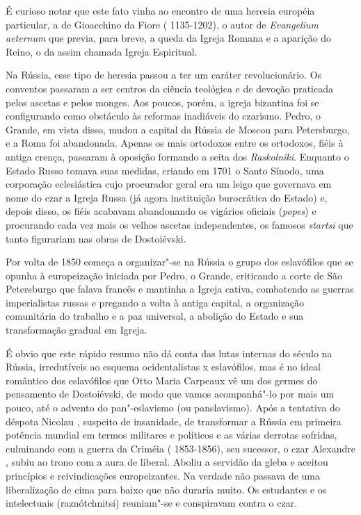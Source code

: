 É curioso notar que este fato vinha ao encontro de uma heresia européia
particular, a de Gioacchino da Fiore ( 1135-1202), o autor de
\emph{Evangelium aeternum} que previa, para breve, a queda da Igreja
Romana e a aparição do  Reino, o da assim chamada Igreja Espiritual.

Na Rússia, esse tipo de heresia passou a ter um caráter revolucionário.
Os conventos passaram a ser centros da ciência teológica e de devoção
praticada pelos ascetas e pelos monges. Aos poucos, porém, a igreja
bizantina foi se configurando como obstáculo às reformas inadiáveis do
czarismo. Pedro, o Grande, em vista disso, mudou a capital da Rússia de
Moscou para Petersburgo, e a  Roma foi abandonada. Apenas os mais
ortodoxos entre os ortodoxos, fiéis à antiga crença, passaram à oposição
formando a seita dos \emph{Raskolniki}. Enquanto o Estado Russo tomava
suas medidas, criando em 1701 o Santo Sínodo, uma corporação
eclesiástica cujo procurador geral era um leigo que governava em nome do
czar a Igreja Russa (já agora instituição burocrática do Estado) e,
depois disso, os fiéis acabavam abandonando os vigários oficiais
(\emph{popes}) e procurando cada vez mais os velhos ascetas
independentes, os famosos \emph{startsi} que tanto figurariam nas obras
de Dostoiévski.

Por volta de 1850 começa a organizar"-se na Rússia o grupo dos
eslavófilos que se opunha à europeização iniciada por Pedro, o Grande,
criticando a corte de São Petersburgo que falava francês e mantinha a
Igreja cativa, combatendo as guerras imperialistas russas e pregando a
volta à antiga capital, a organização comunitária do trabalho e a paz
universal, a abolição do Estado e sua transformação gradual em Igreja.

É obvio que este rápido resumo não dá conta das lutas internas do século
 na Rússia, irredutíveis ao esquema ocidentalistas x eslavófilos, mas
é no ideal romântico dos eslavófilos que Otto Maria Carpeaux vê um dos
germes do pensamento de Dostoiévski, de modo que vamos acompanhá"-lo por
mais um pouco, até o advento do pan"-eslavismo (ou panslavismo). Após a
tentativa do déspota Nicolau , suspeito de insanidade, de transformar a
Rússia em primeira potência mundial em termos militares e políticos e as
várias derrotas sofridas, culminando com a guerra da Criméia (
1853-1856), seu sucessor, o czar Alexandre , subiu ao trono com a aura
de liberal. Aboliu a servidão da gleba e aceitou princípios e
reivindicações europeizantes. Na verdade não passava de uma
liberalização de cima para baixo que não duraria muito. Os estudantes e
os intelectuais (raznótchnitsi) reuniam"-se e conspiravam contra o czar.

